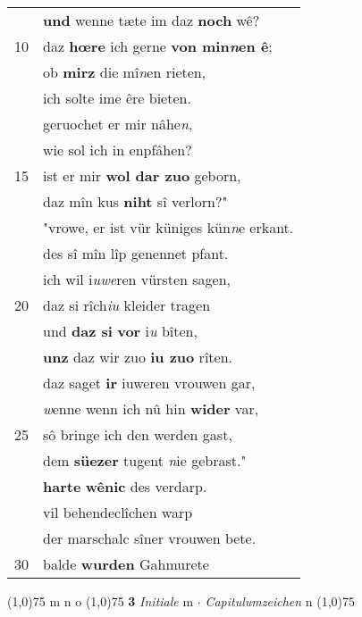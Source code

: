 \documentclass[8pt,a4paper,notitlepage]{article}
\begin{document}
\begin{table}[ht]
\begin{minipage}[t]{0.5\linewidth}
\begin{tabular}{rl}
 & \textbf{und} wenne tæte im daz \textbf{noch} wê?\\ 
10 & daz \textbf{hœre} ich gerne \textbf{von min\textit{n}en ê};\\ 
 & ob \textbf{mirz} die mî\textit{n}en rieten,\\ 
 & ich solte ime êre bieten.\\ 
 & geruochet er mir nâhe\textit{n},\\ 
 & wie sol ich in enpfâhen?\\ 
15 & ist er mir \textbf{wol dar zuo} geborn,\\ 
 & daz mîn kus \textbf{niht} sî verlorn?"\\ 
 & "vrowe, er ist vür küniges kün\textit{n}e erkant.\\ 
 & des sî mîn lîp genennet pfant.\\ 
 & ich wil i\textit{uwe}ren vürsten sagen,\\ 
20 & daz si rîch\textit{iu} kleider tragen\\ 
 & und \textbf{daz si} \textbf{vor} i\textit{u} bîten,\\ 
 & \textbf{unz} daz wir zuo \textbf{iu zuo} rîten.\\ 
 & daz saget \textbf{ir} iuweren vrouwen gar,\\ 
 & \textit{w}enne wenn ich nû hin \textbf{wider} var,\\ 
25 & sô bringe ich den werden gast,\\ 
 & dem \textbf{süezer} tugent \textit{n}ie gebrast."\\ 
 & \textbf{harte} \textbf{wênic} des verdarp.\\ 
 & vil behendeclîchen warp\\ 
 & der marschalc sîner vrouwen bete.\\ 
30 & balde \textbf{wurden} Gahmurete\\ 
\end{tabular}
\scriptsize
\line(1,0){75} \newline
m n o \newline
\line(1,0){75} \newline
\textbf{3} \textit{Initiale} m   $\cdot$ \textit{Capitulumzeichen} n  \newline
\line(1,0){75} \newline

\end{minipage}
\end{table}
\end{document}
